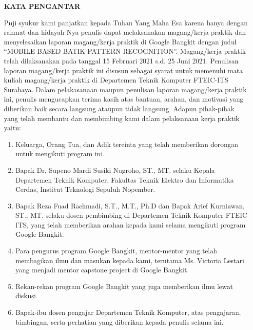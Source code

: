 \begin{center}
  \Large\textbf{KATA PENGANTAR}
\end{center}
\vspace{2ex}


Puji syukur kami panjatkan kepada Tuhan Yang Maha Esa karena hanya dengan rahmat dan hidayah-Nya penulis dapat melaksanakan magang/kerja praktik dan menyelesaikan laporan magang/kerja praktik di Google Bangkit dengan judul “MOBILE-BASED BATIK PATTERN RECOGNITION”.
Magang/kerja praktik telah dilaksanakan pada tanggal 15 Februari 2021 s.d. 25 Juni 2021.
Penulisan laporan magang/kerja praktik ini disusun sebagai syarat untuk memenuhi mata kuliah magang/kerja praktik di Departemen Teknik Komputer FTEIC-ITS Surabaya.
Dalam pelakasanaan maupun penulisan laporan magang/kerja praktik ini, penulis mengucapkan terima kasih atas bantuan, arahan, dan motivasi yang diberikan baik secara langsung ataupun tidak langsung.
Adapun pihak-pihak yang telah membantu dan membimbing kami dalam pelaksanaan kerja praktik yaitu:

\begin{enumerate}[nolistsep]

  \item Keluarga, Orang Tua, dan Adik tercinta yang telah memberikan dorongan untuk mengikuti program ini.

  \item Bapak Dr. Supeno Mardi Susiki Nugroho, ST., MT. selaku Kepala Departemen Teknik Komputer, Fakultas Teknik Elektro dan Informatika Cerdas, Institut Teknologi Sepuluh Nopember.

  \item Bapak Reza Fuad Rachmadi, S.T., M.T., Ph.D dan Bapak Arief Kurniawan, ST., MT. selaku dosen pembimbing di Departemen Teknik Komputer FTEIC-ITS, yang telah memberikan arahan kepada kami selama mengikuti program Google Bangkit.

  \item Para pengurus program Google Bangkit, mentor-mentor yang telah membagikan ilmu dan masukan kepada kami, terutama Ms. Victoria Lestari yang menjadi mentor capstone project di Google Bangkit.

  \item Rekan-rekan program Google Bangkit yang juga memberikan ilmu lewat diskusi.

  \item Bapak-ibu dosen pengajar Departemen Teknik Komputer, atas pengajaran, bimbingan, serta perhatian yang diberikan kepada penulis selama ini.

\end{enumerate}

